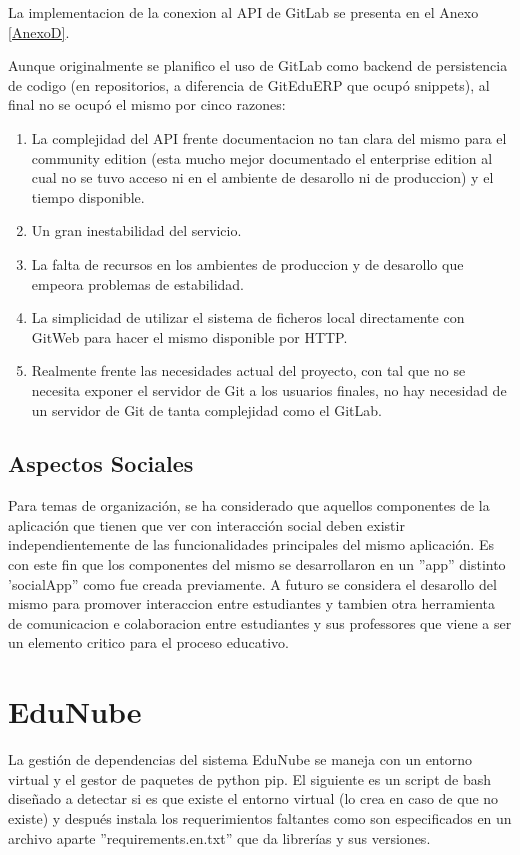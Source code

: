La implementacion de la conexion al API de GitLab se presenta en el Anexo \ref{AnexoD}.

Aunque originalmente se planifico el uso de GitLab como backend de persistencia de codigo (en repositorios, a diferencia de GitEduERP que ocupó snippets), al final no se ocupó el mismo por cinco razones:
\begin{enumerate}
\item La complejidad del API frente documentacion no tan clara del mismo para el community edition (esta mucho mejor documentado el enterprise edition al cual no se tuvo acceso ni en el ambiente de desarollo ni de produccion) y el tiempo disponible.
\item Un gran inestabilidad del servicio.
\item La falta de recursos en los ambientes de produccion y de desarollo que empeora problemas de estabilidad.
\item La simplicidad de utilizar el sistema de ficheros local directamente con GitWeb para hacer el mismo disponible por HTTP.
\item Realmente frente las necesidades actual del proyecto, con tal que no se necesita exponer el servidor de Git a los usuarios finales, no hay necesidad de un servidor de Git de tanta complejidad como el GitLab.
\end{enumerate}

\subsection{Aspectos Sociales}
Para temas de organización, se ha considerado que aquellos componentes de la aplicación que tienen que ver con interacción social deben existir independientemente de las funcionalidades principales del mismo aplicación. Es con este fin que los componentes del mismo se desarrollaron en un ''app'' distinto 'socialApp'' como fue creada previamente. A futuro se considera el desarollo del mismo para promover interaccion entre estudiantes y tambien otra herramienta de comunicacion e colaboracion entre estudiantes y sus professores que viene a ser un elemento critico para el proceso educativo.

\section{EduNube}
La gestión de dependencias del sistema EduNube se maneja con un entorno virtual y el gestor de paquetes de python pip. El siguiente es un script de bash diseñado a detectar si es que existe el entorno virtual (lo crea en caso de que no existe) y después instala los requerimientos faltantes como son especificados en un archivo aparte ''requirements.en.txt'' que da librerías y sus versiones.

